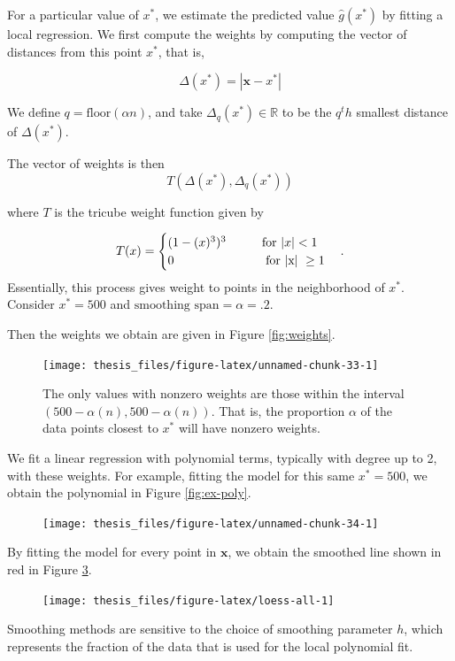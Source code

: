 \documentclass[12pt,twoside]{smiththesis}
\begin{document}
For a particular value of \(x^*\), we estimate the predicted value \(\hat g(x^*)\) by fitting a local regression. We first compute the weights by computing the vector of distances from this point \(x^*\), that is,

\[\Delta (x^*) = |\mathbf x -x^* | \]

We define \(q = \text{floor}(\alpha n)\), and take \(\Delta_q(x^*) \in \mathbb R\) to be the \(q^th\) smallest distance of \(\Delta (x^*)\).

The vector of weights is then
\[T(\Delta(x^*), \Delta_q(x^*))\]

where \(T\) is the tricube weight function given by

\[
T(x) = \begin{cases} (1-(x)^3)^3 \hspace{9 mm}  \text{ for } |x| < 1\\
0  \hspace{25 mm} \text{ for |x| } \geq 1 \end{cases}.
\]
Essentially, this process gives weight to points in the neighborhood of \(x^*\). Consider \(x^* = 500\) and \(\text{smoothing span} = \alpha = .2\).

Then the weights we obtain are given in Figure \ref{fig:weights}.
\begin{figure}

{\centering \texttt{[image: thesis\_files/figure-latex/unnamed-chunk-33-1]} 

}

\caption{\label{fig:weights} The only values with nonzero weights are those within the interval $(500 - \alpha (n), 500 - \alpha (n))$. That is, the proportion $\alpha$ of the data points closest to $x^*$ will have nonzero weights.}\label{fig:unnamed-chunk-33}
\end{figure}
\newpage

We fit a linear regression with polynomial terms, typically with degree up to 2, with these weights. For example, fitting the model for this same \(x^*=500\), we obtain the polynomial in Figure \ref{fig:ex-poly}.
\begin{flushleft}
\begin{figure}

{\centering \texttt{[image: thesis\_files/figure-latex/unnamed-chunk-34-1]} 

}

\caption{\label{fig:ex-poly}}\label{fig:unnamed-chunk-34}
\end{figure}
\end{flushleft}
By fitting the model for every point in \(\mathbf x\), we obtain the smoothed line shown in red in Figure \ref{fig:loess-all}.
\begin{figure}

{\centering \texttt{[image: thesis\_files/figure-latex/loess-all-1]} 

}

\caption{\label{loess-all}}\label{fig:loess-all}
\end{figure}
Smoothing methods are sensitive to the choice of smoothing parameter \(h\), which represents the fraction of the data that is used for the local polynomial fit.
\end{document}
